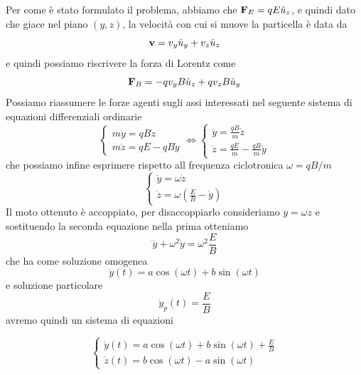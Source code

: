 Per come \`e stato formulato il problema, abbiamo che $\bold{F}_{E} = qE \hat{u}_{z}$, e quindi dato che giace nel piano $(y,z)$, la velocit\`a  con cui si muove la particella \`e data da
\begin{equation*}
	\bold{v} = v_y \hat{u}_{y} + v_z \hat{u}_{z}
\end{equation*}
e quindi possiamo riscrivere la forza di Lorentz come
\begin{equation*}
	\bold{F}_{B} = -qv_yB \hat{u}_z + qv_zB \hat{u}_{y} 
\end{equation*}
Possiamo riassumere le forze agenti sugli assi interessati nel seguente sistema di equazioni differenziali ordinarie
\begin{equation*}
	\left \{ \begin{array}{l}
		m \ddot{y} = qB\dot{z} \\[0.3cm]
		m \ddot{z} = qE - qB \dot{y}
 	\end{array}\right. 
 	\iff 
 	\left \{ \begin{array}{l}
		 \ddot{y} = \frac{qB}{m}\dot{z} \\[0.3cm]
		 \ddot{z} = \frac{qE}{m} - \frac{qB}{m} \dot{y}
 	\end{array}\right. 
\end{equation*}
che possiamo infine esprimere rispetto all frequenza ciclotronica $\omega = qB/m$
\begin{equation*}
	\left \{ \begin{array}{l}
		\ddot{y} = \omega \dot{z} \\[0.3cm]
		 \ddot{z} = \omega \left (\frac{E}{B} - \dot{y}\right)
 	\end{array}\right. 
\end{equation*}
Il moto ottenuto \`e accoppiato, per disaccoppiarlo consideriamo $\dddot{y} = \omega\ddot{z}$ e sostituendo la seconda equazione nella prima otteniamo 
\begin{equation*}
	\dddot{y} + \omega^2 \dot{y} = \omega^2 \frac{E}{B}
\end{equation*}
che ha come soluzione omogenea 
\begin{equation*}
	\dot{y}(t) = a \cos(\omega t) + b \sin (\omega t)
\end{equation*}
e soluzione particolare 
\begin{equation*}
	\dot{y}_p(t) = \frac{E}{B}
\end{equation*}
avremo quindi un sistema di equazioni

\begin{equation*}
	\left \{ \begin{array}{l}
		\dot{y}(t) = a \cos(\omega t) + b \sin (\omega t) + \frac{E}{B}\\[0.3cm]
		\dot{z}(t) = b \cos(\omega t) - a \sin (\omega t) 
	\end{array}\right.
\end{equation*}

